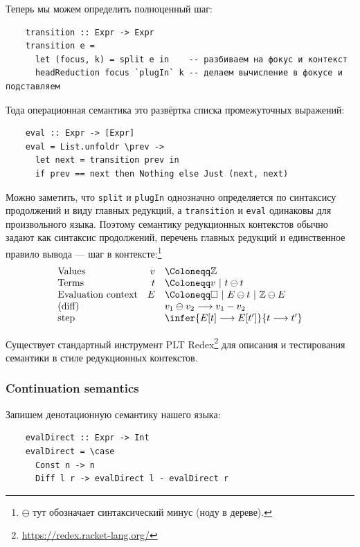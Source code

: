 Теперь мы можем определить полноценный шаг:
\begin{verbatim}
    transition :: Expr -> Expr
    transition e =
      let (focus, k) = split e in    -- разбиваем на фокус и контекст
      headReduction focus `plugIn` k -- делаем вычисление в фокусе и подставляем
\end{verbatim}

Тода операционная семантика это развёртка списка промежуточных выражений:
\begin{verbatim}
    eval :: Expr -> [Expr]
    eval = List.unfoldr \prev ->
      let next = transition prev in
      if prev == next then Nothing else Just (next, next)
\end{verbatim}

Можно заметить, что \texttt{split} и \texttt{plugIn} однозначно определяется по синтаксису продолжений и виду главных редукций, а \texttt{transition} и \texttt{eval} одинаковы для произвольного языка.
Поэтому семантику редукционных контекстов обычно задают как синтаксис продолжений, перечень главных редукций и единственное правило вывода --- шаг в контексте:\footnote{$\ominus$ тут обозначает синтаксический минус (ноду в дереве).}
\[
    \begin{array}{lrl}
        \text{Values}             & v & \Coloneqq \mathbb{Z}                                       \\
        \text{Terms}              & t & \Coloneqq v ~|~ t \ominus t                                \\
        \text{Evaluation context} & E & \Coloneqq \square ~|~ E \ominus t ~|~ \mathbb{Z} \ominus E \\
        \text{(diff)}             &   & v_1 \ominus v_2 \longrightarrow v_1 - v_2                  \\
        \text{step}               &   & \infer{E[t] \longrightarrow E[t']}{t \longrightarrow t'}
    \end{array}
\]

Существует стандартный инструмент PLT Redex\footnote{\url{https://redex.racket-lang.org/}} для описания и тестирования семантики в стиле редукционных контекстов.

\subsubsection{Continuation semantics} \label{subsubsec:continuation-semantics}

Запишем денотационную семантику нашего языка:
\begin{verbatim}
    evalDirect :: Expr -> Int
    evalDirect = \case
      Const n -> n
      Diff l r -> evalDirect l - evalDirect r
\end{verbatim}

